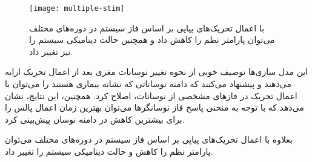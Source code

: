 \begin{figure}[h!]
	\centering
	\texttt{[image: multiple-stim]}
    \caption{
با اعمال تحریک‌های پیاپی بر اساس فاز سیستم در دوره‌های مختلف می‌توان پارامتر نظم را کاهش داد و همچنین حالت دینامیکی سیستم را نیز تغییر داد.
    }
\end{figure}


%



%
%

%

این مدل سازی‌ها توصیف خوبی از نحوه تغییر نوسانات مغزی بعد از اعمال تحریک ارایه می‌دهند و پیشنهاد می‌کنند که دامنه نوساناتی که نشانه بیماری هستند را می‌توان با اعمال تحریک در فازهای مشخصی از نوسانات، اصلاح کرد. همچنین، این نتایج، نشان می‌دهد که با توجه به منحنی پاسخ فاز نوسانگرها می‌توان بهترین زمان اعمال پالس را برای بیشترین کاهش در دامنه نوسان پیش‌بینی کرد.



بعلاوه با اعمال تحریک‌های پیاپی بر اساس فاز سیستم در دوره‌های مختلف می‌توان پارامتر نظم را کاهش و حالت دینامیکی سیستم را تغییر داد.
\\ \\ \\ \\

